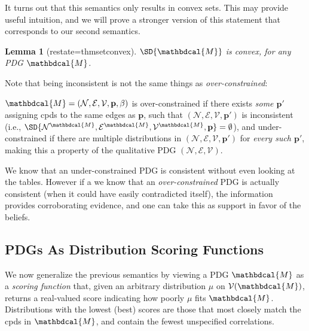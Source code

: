 \documentclass{article}
\theoremstyle{plain}
\newtheorem{lemma}[theorem]{Lemma}
\theoremstyle{definition}
\theoremstyle{remark}
\newcommand\mat[1]{\mathbf{#1}}
\newcommand{\notation}[2][]{#1}
\renewcommand{\notation}[2][]{{\color{notationcolor} #2}}
\newcommand{\V}{\mathcal V}
\newcommand{\N}{\mathcal N}
\newcommand{\Ed}{\mathcal E}
\newcommand{\pdgvars}[1][]{(\N#1, \Ed#1, \V#1, \mat p#1, \beta#1)}
\newcommand{\dg}[1]{\mathbdcal{#1}}
\numberwithin{equation}{section}
\begin{document}
	\begin{vfull}
		It turns out that this semantics only results in convex sets. This may provide useful intuition, and we will prove a stronger version of this statement that corresponds to our second semantics.
		\begin{lemma}[restate=thmsetconvex] 
			\label{prop:convex}
			$\SD{\dg M}$ is convex, for any PDG $\dg M$.
		\end{lemma}
	
		Note that being inconsistent is not the same things as \emph{over-constrained}: 	
		\begin{defn}
			$\dg M = \pdgvars[]$ is over-constrained if there exists
			  \emph{some $\mat p'$} assigning cpds to the same edges as
			  $\mat p$, such that $(\N, \Ed, \V, \mat p')$ is inconsistent
			  \notation{(i.e., $\SD{\N^\dg M, \Ed^\dg M, \V^\dg M, \mat p}
				= \emptyset$)}, and under-constrained if there are
			  multiple distributions in $(\N, \Ed, \V, \mat p')$ for
			  \emph{every such $\mat p'$}, making this a property of the
			  qualitative PDG $(\N, \Ed, \V)$.  
		\end{defn}

		We know that an under-constrained PDG is consistent without even looking at the tables. However if a we know that an \emph{over-constrained} PDG is actually consistent (when it could have easily contradicted itself), the information provides corroborating evidence, and one can take this as support in favor of the beliefs. 
	\end{vfull}
        
\subsection{PDGs As Distribution Scoring Functions}
\label{sec:scoring-semantics}   
We now generalize the previous semantics by viewing a PDG $\dg M$ as
a \emph{scoring function} that, given an arbitrary distribution $\mu$ on $\V(\dg M)$, 
returns a real-valued score indicating how 
poorly
$\mu$ fits $\dg M$. Distributions with the lowest (best) scores are those that
most closely match the cpds in $\dg M$, and contain the fewest unspecified correlations.
\end{document}
